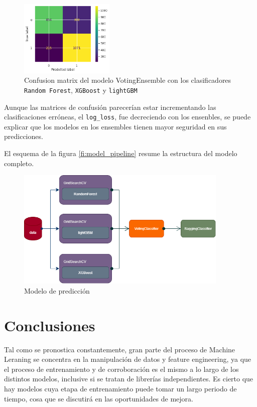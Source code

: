 \documentclass[titlepage,a4paper]{article}
\begin{document}
\begin{figure}[H]
\centering
\includegraphics[width=0.4\textwidth]{images/conf_mat_bag_ens.png}
\cprotect\caption{\label{fig:plot_tree} Confusion matrix del modelo VotingEnsemble con los clasificadores \verb|Random Forest|, \verb|XGBoost| y \verb|lightGBM|}
\end{figure}

Aunque las matrices de confusión parecerían estar incrementando las clasificaciones erróneas, el \verb|log_loss|, fue decreciendo con los ensenbles, se puede explicar que los modelos en los ensembles tienen mayor seguridad en sus predicciones.

El esquema de la figura \ref{fi:model_pipeline} resume la estructura del modelo completo.
\begin{figure}[H]
\centering
\includegraphics[width=0.9\textwidth]{images/model_pipeline.png}
\cprotect\caption{\label{fig:model_pipeline} Modelo de predicción}
\end{figure}


\section{Conclusiones}\label{sec:conclusiones}
Tal como se pronostica constantemente, gran parte del proceso de Machine Leraning se concentra en la manipulación de datos y feature engineering, ya que el proceso de entrenamiento y de corroboración es el mismo a lo largo de los distintos modelos, inclusive si se tratan de librerías independientes. Es cierto que hay modelos cuya etapa de entrenamiento puede tomar un largo periodo de tiempo, cosa que se discutirá en las oportunidades de mejora. 
\end{document}
